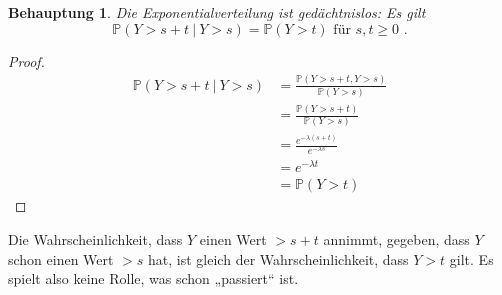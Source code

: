 \documentclass[a4paper]{scrartcl}
\newtheorem*{behaupt}{Behauptung}
\newcommand{\prob}{\mathbb{P}}
\def \blattnr {4}
\begin{document}
\begin{enumerate}[label=\bfseries \blattnr.\arabic*]
\begin{enumerate}
                \begin{behaupt}
                    Die Exponentialverteilung ist gedächtnislos:
                    Es gilt
                    \begin{equation*}
                        \prob(Y > s + t\ |\ Y > s) = \prob(Y > t)
                        \text{ für }
                        s,t \geq 0
                        \text{ .}
                    \end{equation*}
                \end{behaupt}
                \begin{proof}
                    \begin{equation*}
                        \begin{split}
                            \prob(Y > s + t\ |\ Y > s)
                            &= \frac{\prob(Y > s+t, Y > s)}{\prob(Y > s)} \\
                            &= \frac{\prob(Y > s+t)}{\prob(Y > s)} \\
                            &= \frac{e^{-\lambda (s+t)}}{e^{-\lambda s}} \\
                            &= e^{-\lambda t} \\
                            &= \prob(Y > t)
                        \end{split}
                    \end{equation*}
                \end{proof}
                Die Wahrscheinlichkeit, dass $Y$ einen Wert $> s+t$ annimmt,
                gegeben, dass $Y$ schon einen Wert $> s$ hat, ist gleich der
                Wahrscheinlichkeit, dass $Y > t$ gilt. Es spielt also keine
                Rolle, was schon „passiert“ ist.


\end{enumerate}
\end{enumerate}
\end{document}
